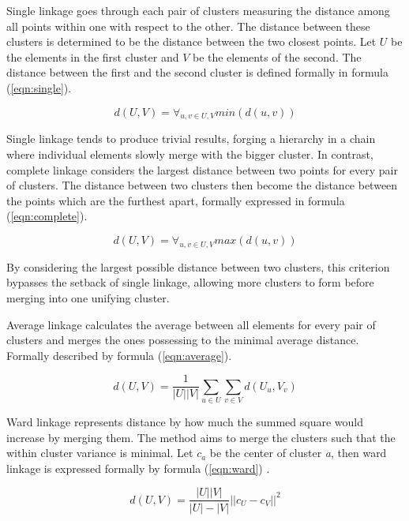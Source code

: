 Single linkage goes through each pair of clusters measuring the distance among all points within one with respect to the other. The distance between these clusters is determined to be the distance between the two closest points. Let $U$ be the elements in the first cluster and $V$ be the elements of the second. The distance between the first and the second cluster is defined formally in formula (\ref{eqn:single}).

\begin{equation}
\label{eqn:single}
d(U, V) = \forall_{u, v \in U, V} min(d(u, v))
\end{equation}

Single linkage tends to produce trivial results, forging a hierarchy in a chain where individual elements slowly merge with the bigger cluster. In contrast, complete linkage considers the largest distance between two points for every pair of clusters. The distance between two clusters then become the distance between the points which are the furthest apart, formally expressed in formula (\ref{eqn:complete}).

\begin{equation}
\label{eqn:complete}
d(U, V) = \forall_{u, v \in U, V} max(d(u, v))
\end{equation}

By considering the largest possible distance between two clusters, this criterion bypasses the setback of single linkage, allowing more clusters to form before merging into one unifying cluster.

Average linkage calculates the average between all elements for every pair of clusters and merges the ones possessing to the minimal average distance. Formally described by formula (\ref{eqn:average}).

\begin{equation}
\label{eqn:average}
d(U, V) = \frac{1}{|U||V|}\sum\limits_{u\in U} \sum\limits_{v\in V}  d(U_u, V_v)
\end{equation}

Ward linkage represents distance by how much the summed square would increase by merging them. The method aims to merge the clusters such that the within cluster variance is minimal. Let $c_a$ be the center of cluster \textit{a}, then ward linkage is expressed formally by formula (\ref{eqn:ward}) \cite{shalizi2009distances}.


\begin{equation}
\label{eqn:ward}
d(U, V) = \frac{|U||V|}{|U|-|V|}||c_U - c_V||^2
\end{equation}



